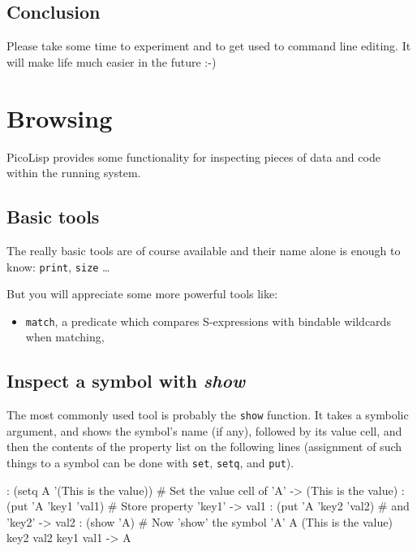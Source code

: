  
\subsection{Conclusion}
\label{sec:tut-conclusion}


Please take some time to experiment and to get used to command line
editing. It will make life much easier in the future :-)


 
\section{Browsing}
\label{sec:tut-browsing}


PicoLisp provides some functionality for inspecting pieces of data and
code within the running system.

 
\subsection{Basic tools}
\label{sec:tut-basic-tools}


The really basic tools are of course available and their name alone is
enough to know: \texttt{print}, \texttt{size} \ldots{}

But you will appreciate some more powerful tools like:

\begin{itemize}
\item \texttt{match}, a predicate which compares S-expressions with bindable
   wildcards when matching,
\end{itemize}

 
\subsection{Inspect a symbol with \emph{show}}
\label{sec:tut-inspect-a-symbol-with-show}


The most commonly used tool is probably the \texttt{show} function. It takes a
symbolic argument, and shows the symbol's name (if any), followed by its
value cell, and then the contents of the property list on the following
lines (assignment of such things to a symbol can be done with \texttt{set},
\texttt{setq}, and \texttt{put}).


\begin{wideverbatim}
: (setq A '(This is the value))  # Set the value cell of 'A'
-> (This is the value)
: (put 'A 'key1 'val1)           # Store property 'key1'
-> val1
: (put 'A 'key2 'val2)           # and 'key2'
-> val2
: (show 'A)                      # Now 'show' the symbol 'A'
A (This is the value)
   key2 val2
   key1 val1
-> A
\end{wideverbatim}


